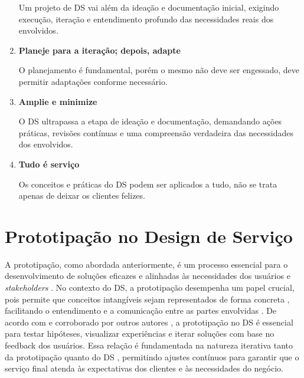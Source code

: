 \begin{enumerate}
	Um projeto de DS vai além da ideação e documentação inicial, exigindo execução, iteração e entendimento profundo das necessidades reais dos envolvidos.
	
	\item \textbf{Planeje para a iteração; depois, adapte}
	
	O planejamento é fundamental, porém o mesmo não deve ser engessado, deve permitir adaptações conforme necessário.
	
	\item \textbf{Amplie e minimize}
	
	O DS ultrapassa a etapa de ideação e documentação, demandando ações práticas, revisões contínuas e uma compreensão verdadeira das necessidades dos envolvidos.
	
	\item \textbf{Tudo é serviço}
	
	Os conceitos e práticas do DS podem ser aplicados a tudo, não se trata apenas de deixar os clientes felizes.
	
\end{enumerate}

\section{Prototipação no Design de Serviço}


A prototipação, como abordada anteriormente, é um processo essencial para o desenvolvimento de soluções eficazes e alinhadas às necessidades dos usuários e \textit{stakeholders} \cite{Blomkvist2014, paust2025integrative}. No contexto do DS, a prototipação desempenha um papel crucial, pois permite que conceitos intangíveis sejam representados de forma concreta \cite{Stickdorn2019, mager2023product, soto2023prototyping}, facilitando o entendimento e a comunicação entre as partes envolvidas \cite{Blomkvist2014, paust2025integrative, wang2023smartproducts}. De acordo com  e corroborado por outros autores \cite{paust2025integrative, asbjornsen2022echange, kumar2023rheumatology}, a prototipação no DS é essencial para testar hipóteses, visualizar experiências e iterar soluções com base no feedback dos usuários. Essa relação é fundamentada na natureza iterativa tanto da prototipação quanto do DS \cite{Stickdorn2019, kumar2023rheumatology, paust2025integrative}, permitindo ajustes contínuos para garantir que o serviço final atenda às expectativas dos clientes e às necessidades do negócio.



